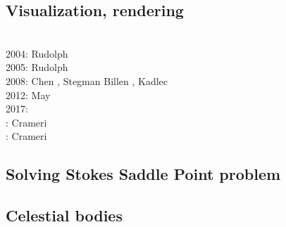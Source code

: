 \subsection{Visualization, rendering}

\begin{scriptsize}
\cite{faha}\\
2004: Rudolph \etal \cite{rugy04}\\
2005: Rudolph \etal \cite{rugy05}\\
2008: Chen \etal \cite{chzy08}, Stegman \etal \cite{stmt08}
      Billen \etal \cite{bikh08}, Kadlec \etal \cite{kadt08}\\
2012: May \cite{may12}\\
2017: \cite{krke17}\\
\twothousandeighteen: Crameri \cite{cram18}\\
\twothousandtwenty: Crameri \etal \cite{crsh20}
\end{scriptsize}

\subsection{Solving Stokes Saddle Point problem}

\begin{scriptsize}
\cite{laqu86}
\cite{rotf90}
\cite{frha93}
\cite{elgo94}
\cite{cheb96}\cite{elma96}
\cite{brpv97}
\cite{lixu01}
\cite{dogs06}\cite{lica06}
\cite{hoow17}
\end{scriptsize}

\subsection{Celestial bodies}

